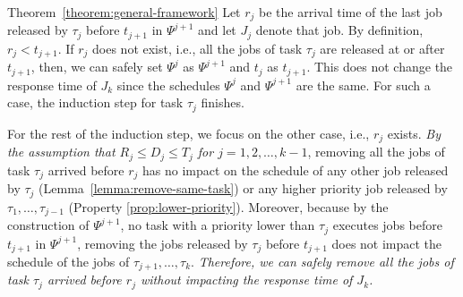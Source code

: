 \begin{appProof}{Theorem~\ref{theorem:general-framework}}
Let $r_j$ be the arrival time of the last job released by $\tau_j$ before $t_{j+1}$ in $\Psi^{j+1}$ and let $J_{j}$ denote that job. By definition, $r_j < t_{j+1}$. %
If $r_j$ does not exist, i.e., all the jobs of task $\tau_j$ are released at  or after $t_{j+1}$, then, we can safely set $\Psi^j$ as $\Psi^{j+1}$ and $t_j$ as $t_{j+1}$. This does not change the response time of $J_k$ since the schedules $\Psi^j$ and $\Psi^{j+1}$ are the same. For such a case, the induction step for task $\tau_j$ finishes. 

For the rest of the induction step, we focus on the other case, i.e., $r_j$ exists.
\emph{By the assumption that $R_j \leq D_j \leq T_j$ for $j=1,2,\ldots,k-1$}, removing all the jobs of task $\tau_j$ arrived before $r_j$ has no impact on the schedule of any other job released by $\tau_j$ (Lemma~\ref{lemma:remove-same-task}) or any higher priority job released by $\tau_1, \ldots, \tau_{j-1}$ (Property \ref{prop:lower-priority}). Moreover, because by the construction of $\Psi^{j+1}$, no task with a priority lower than $\tau_j$ executes jobs before $t_{j+1}$ in $\Psi^{j+1}$, removing the jobs released by $\tau_j$ before $t_{j+1}$ does not impact the schedule of the jobs of $\tau_{j+1}, \ldots, \tau_{k}$. \emph{Therefore, we can safely remove all the jobs of task $\tau_j$ arrived before $r_j$ without impacting the response time of $J_{k}$.}


\end{appProof}
